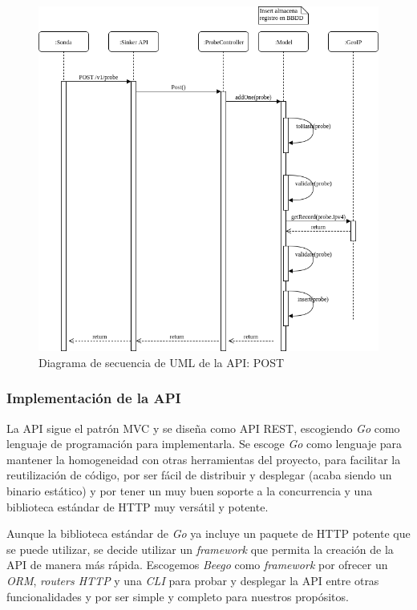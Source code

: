 \begin{figure}[htp]
    \centering
      \includegraphics[scale=0.6]{images/UMLSequencePostProbe}
    \caption{Diagrama de secuencia de UML de la API: POST}
    \label{fig:uml-sequence-post-probe}
\end{figure}

\subsubsection{Implementación de la API}
\label{sinkers-regeistry-api-implementacion}

La API sigue el patrón MVC y se diseña como API REST, escogiendo \emph{Go} como lenguaje de programación para implementarla. Se escoge \emph{Go} 
como lenguaje para mantener la homogeneidad con otras herramientas del proyecto, para facilitar la reutilización de código,
por ser fácil de distribuir y desplegar (acaba siendo un binario estático) y por tener un muy buen soporte a la concurrencia y una biblioteca
estándar de HTTP muy versátil y potente.

Aunque la biblioteca estándar de \emph{Go} ya incluye un paquete de HTTP potente que se puede utilizar, se decide utilizar un \emph{framework} 
que permita la creación de la API de manera más rápida. Escogemos \emph{Beego} como \emph{framework} por ofrecer un \emph{ORM},
\emph{routers HTTP} y una \emph{CLI} para probar y desplegar la API entre otras funcionalidades y por ser simple y completo para nuestros
propósitos.

